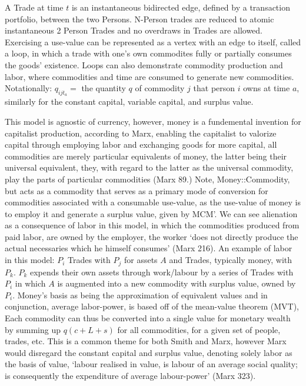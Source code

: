 \documentclass[12pt]{article}
\begin{document}
A Trade at time $t$ is an instantaneous bidirected edge, defined by a transaction portfolio, between the two Persons.
N-Person trades are reduced to atomic instantaneous 2 Person Trades and no overdraws in Trades are allowed. 
Exercising a use-value can be represented as a vertex with an edge to itself, called a loop, in which a trade with one's own commodites fully or partially consumes the goods' existence. 
Loops can also demonstrate commodity production and labor, where commodities and time are consumed to generate new commodities. 
Notationally: $q_{ijt_{a}} =$ the quantity $q$ of commodity $j$ that person $i$ owns at time $a$, similarly for the constant capital, variable capital, and surplus value. \par

This model is agnostic of currency, however, money is a fundemental invention for capitalist production, according to Marx, enabling the capitalist to valorize capital through employing labor and exchanging goods for more capital, all commodities are merely particular equivalents of money, the latter being their universal equivalent, they, with regard to the latter as the universal commodity, play the parts of particular commodities (Marx 89.)
Note, Money::Commodity, but acts as a commodity that serves as a primary mode of conversion for commodities associated with a consumable use-value, as the use-value of money is to employ it and generate a surplus value, given by MCM'.
We can see alienation as a consequence of labor in this model, in which the commodities produced from paid labor, are owned by the employer, the worker `does not directly produce the actual necessaries which he himself consumes' (Marx 216).
An example of labor in this model: $P_i$ Trades with $P_j$ for assets $A$ and Trades, typically money, with $P_k$.
$P_k$ expends their own assets through work/labour by a series of Trades with $P_i$ in which $A$ is augmented into a new commodity with surplus value, owned by $P_i$.  
Money's basis as being the approximation of equivalent values and in conjunction, average labor-power, is based off of the mean-value theorem (MVT),
Each commodity can thus be converted into a single value for monetary wealth by summing up $q(c+L+s)$ for all commodities, for a given set of people, trades, etc. This is a common theme for both Smith and Marx, however Marx would disregard the constant capital and surplus value, denoting solely labor as the basis of value, `labour realised in value, is labour of an average social quality; is consequently the expenditure of average labour-power' (Marx 323).
\end{document}

